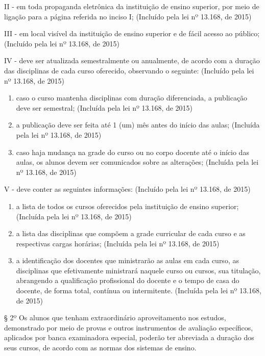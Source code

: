 \documentclass[
]{book}
\begin{document}
II - em toda propaganda eletrônica da instituição de ensino superior, por meio de ligação para a página referida no inciso I; (Incluído pela lei nº 13.168, de 2015)

III - em local visível da instituição de ensino superior e de fácil acesso ao público; (Incluído pela lei nº 13.168, de 2015)

IV - deve ser atualizada semestralmente ou anualmente, de acordo com a duração das disciplinas de cada curso oferecido, observando o seguinte: (Incluído pela lei nº 13.168, de 2015)

\begin{enumerate}
\def\labelenumi{\alph{enumi})}
\item
  caso o curso mantenha disciplinas com duração diferenciada, a publicação deve ser semestral; (Incluída pela lei nº 13.168, de 2015)
\item
  a publicação deve ser feita até 1 (um) mês antes do início das aulas; (Incluída pela lei nº 13.168, de 2015)
\item
  caso haja mudança na grade do curso ou no corpo docente até o início das aulas, os alunos devem ser comunicados sobre as alterações; (Incluída pela lei nº 13.168, de 2015)
\end{enumerate}

V - deve conter as seguintes informações: (Incluído pela lei nº 13.168, de 2015)

\begin{enumerate}
\def\labelenumi{\alph{enumi})}
\item
  a lista de todos os cursos oferecidos pela instituição de ensino superior; (Incluída pela lei nº 13.168, de 2015)
\item
  a lista das disciplinas que compõem a grade curricular de cada curso e as respectivas cargas horárias; (Incluída pela lei nº 13.168, de 2015)
\item
  a identificação dos docentes que ministrarão as aulas em cada curso, as disciplinas que efetivamente ministrará naquele curso ou cursos, sua titulação, abrangendo a qualificação profissional do docente e o tempo de casa do docente, de forma total, contínua ou intermitente. (Incluída pela lei nº 13.168, de 2015)
\end{enumerate}

§ 2º Os alunos que tenham extraordinário aproveitamento nos estudos, demonstrado por meio de provas e outros instrumentos de avaliação específicos, aplicados por banca examinadora especial, poderão ter abreviada a duração dos seus cursos, de acordo com as normas dos sistemas de ensino.
\end{document}
